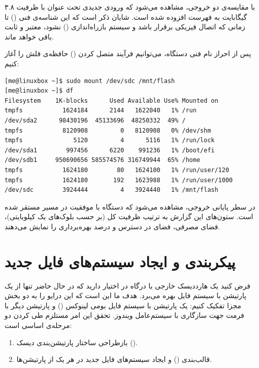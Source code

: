 با مقایسه‌ی دو خروجی، مشاهده می‌شود که ورودی جدیدی تحت عنوان  با ظرفیت ۳.۸ گیگابایت به فهرست افزوده شده است. شایان ذکر است که این شناسه‌ی فنی () تا زمانی که اتصال فیزیکی برقرار باشد و سیستم بازراه‌اندازی () نشود، معتبر و ثابت باقی خواهد ماند.

پس از احراز نام فنی دستگاه، می‌توانیم فرآیند متصل کردن () حافظه‌ی فلش را آغاز کنیم:

\begin{latin}
\begin{lstlisting}
[me@linuxbox ~]$ sudo mount /dev/sdc /mnt/flash
[me@linuxbox ~]$ df
Filesystem    1K-blocks      Used Available Use% Mounted on
tmpfs           1624184      2144   1622040   1% /run
/dev/sda2      98430196  45133696  48250332  49% /
tmpfs           8120908         0   8120908   0% /dev/shm
tmpfs              5120         4      5116   1% /run/lock
/dev/sda1        997456      6220    991236   1% /boot/efi
/dev/sdb1     950690656 585574576 316749944  65% /home
tmpfs           1624180        80   1624100   1% /run/user/120
tmpfs           1624180       192   1623988   1% /run/user/1000
/dev/sdc        3924444         4   3924440   1% /mnt/flash
\end{lstlisting}
\end{latin}

در سطر پایانی خروجی، مشاهده می‌شود که دستگاه  با موفقیت در مسیر  مستقر شده است. ستون‌های این گزارش به ترتیب ظرفیت کل (بر حسب بلوک‌های یک کیلوبایتی)، فضای مصرفی، فضای در دسترس و درصد بهره‌برداری را نمایش می‌دهند.

\section{پیکربندی و ایجاد سیستم‌های فایل جدید}

فرض کنید یک هارددیسک خارجی با درگاه  در اختیار دارید که در حال حاضر تنها از یک پارتیشن با سیستم فایل  بهره می‌برد. هدف ما این است که این درایو را به دو بخش مجزا تفکیک کنیم: یک پارتیشن با سیستم فایل بومی لینوکس () و پارتیشن دیگر با فرمت  جهت سازگاری با سیستم‌عامل ویندوز. تحقق این امر مستلزم طی کردن دو مرحله‌ی اساسی است:

\begin{enumerate}
  \item بازطراحی ساختار پارتیشن‌بندی دیسک ().
  \item قالب‌بندی () و ایجاد سیستم‌های فایل جدید در هر یک از پارتیشن‌ها.
\end{enumerate}

